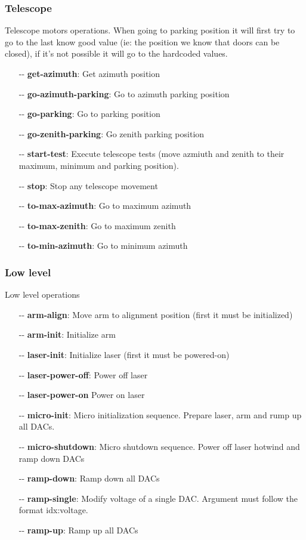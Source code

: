 \documentclass[letterpaper, 10 pt]{article}
\begin{document}
\subsubsection{Telescope}
Telescope motors operations. When going to parking position it will first try to go to the last know good value (ie: the position we know that doors can be closed), if it's not possible it will go to the hardcoded values.
\begin{itemize}
	\item[-{}-] \textbf{get-azimuth}: Get azimuth position
	\item[-{}-] \textbf{go-azimuth-parking}: Go to azimuth parking position
	\item[-{}-] \textbf{go-parking}: Go to parking position
	\item[-{}-] \textbf{go-zenith-parking}: Go zenith parking position
	\item[-{}-] \textbf{start-test}: Execute telescope tests (move azmiuth and zenith to their maximum, minimum and parking position).
	\item[-{}-] \textbf{stop}: Stop any telescope movement
	\item[-{}-] \textbf{to-max-azimuth}: Go to maximum azimuth
	\item[-{}-] \textbf{to-max-zenith}: Go to maximum zenith
	\item[-{}-] \textbf{to-min-azimuth}: Go to minimum azimuth		
\end{itemize}
\subsubsection{Low level}
Low level operations
\begin{itemize}
	\item[-{}-] \textbf{arm-align}: Move arm to alignment position (first it must be initialized)
	\item[-{}-] \textbf{arm-init}: Initialize arm
	\item[-{}-] \textbf{laser-init}: Initialize laser (first it must be powered-on)
	\item[-{}-] \textbf{laser-power-off}: Power off laser
	\item[-{}-] \textbf{laser-power-on} Power on laser
	\item[-{}-] \textbf{micro-init}: Micro initialization sequence. Prepare laser, arm and rump up all DACs.
	\item[-{}-] \textbf{micro-shutdown}: Micro shutdown sequence. Power off laser hotwind and ramp down DACs
	\item[-{}-] \textbf{ramp-down}: Ramp down all DACs
	\item[-{}-] \textbf{ramp-single}: Modify voltage of a single DAC. Argument must follow the format idx:voltage.
	\item[-{}-] \textbf{ramp-up}: Ramp up all DACs
\end{itemize}
\end{document}
